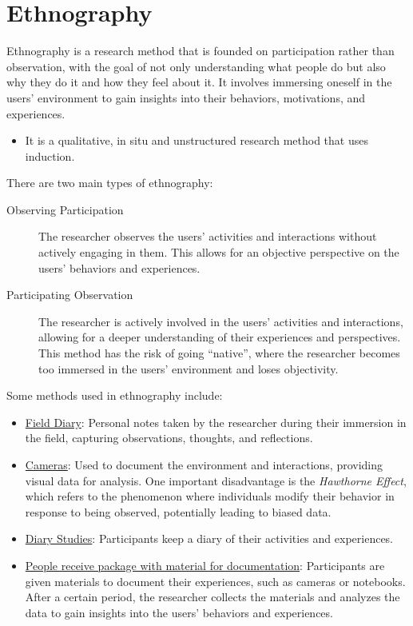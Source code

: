 \section{Ethnography}

Ethnography is a research method that is founded on participation rather than observation, with the goal of not only understanding what people do but also why they do it and how they feel about it. It involves immersing oneself in the users' environment to gain insights into their behaviors, motivations, and experiences.
\begin{itemize}
    \item It is a qualitative, in situ and unstructured research method that uses induction.
\end{itemize}

There are two main types of ethnography:
\begin{description}
    \item[Observing Participation] The researcher observes the users' activities and interactions without actively engaging in them. This allows for an objective perspective on the users' behaviors and experiences.
    \item[Participating Observation] The researcher is actively involved in the users' activities and interactions, allowing for a deeper understanding of their experiences and perspectives. This method has the risk of going ``native'', where the researcher becomes too immersed in the users' environment and loses objectivity.
\end{description}

Some methods used in ethnography include:
\begin{itemize}
    \item \ul{Field Diary}: Personal notes taken by the researcher during their immersion in the field, capturing observations, thoughts, and reflections.
    \item \ul{Cameras}: Used to document the environment and interactions, providing visual data for analysis. One important disadvantage is the \emph{Hawthorne Effect}, which refers to the phenomenon where individuals modify their behavior in response to being observed, potentially leading to biased data.
    \item \ul{Diary Studies}: Participants keep a diary of their activities and experiences.
    \item \ul{People receive package with material for documentation}: Participants are given materials to document their experiences, such as cameras or notebooks. After a certain period, the researcher collects the materials and analyzes the data to gain insights into the users' behaviors and experiences.
\end{itemize}



